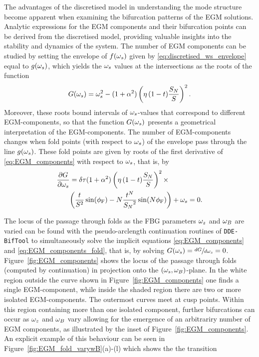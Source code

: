 %
The advantages of the discretised model in understanding the mode structure become apparent when examining the bifurcation patterns of the EGM solutions.
Analytic expressions for the EGM components and their bifurcation points can be derived from the discretised model, providing valuable insights into the stability and dynamics of the system.
The number of EGM components can be studied by setting the envelope of $f(\omega_s)$ given by \eqref{eq:discretised_ws_envelope} equal to $g(\omega_s)$, which yields the $\omega_s$ values at the intersections as the roots of the function
%
\begin{equation}
    \label{eq:EGM_components}
    G(\omega_s) = \omega_s^2 - (1+\alpha^2)\left( \eta \, (1-t) \frac{S_N}{S} \right)^2.
 \end{equation}
Moreover, these roots bound intervals of $\omega_s$-values that correspond to different EGM-components, so that the function $G(\omega_s)$ presents a geometrical interpretation of the EGM-components. 
The number of EGM-components changes when fold points (with respect to $\omega_s$) of the envelope pass through the line $g(\omega_s)$. 
These fold points are given by roots of the first derivative of \eqref{eq:EGM_components} with respect to $\omega_s$, that is, by
%
\begin{gather}
    \label{eq:EGM_components_fold}
    \begin{aligned}
        \frac{\partial G}{\partial \omega_s} &= \delta \tau (1+\alpha^2)\left( \eta \, (1-t) \frac{S_N}{S} \right)^2 \times \\ 
        &\bigg(  \frac{t}{S^2} \sin(\phi_\text{F}) - N \frac{t^{N}}{{S_N}^2}\sin(N\phi_\text{F}) \bigg) + \omega_s = 0.
    \end{aligned}
\end{gather}
%
\par
%
The locus of the passage through folds as the FBG parameters $\omega_z$ and $\omega_B$ are varied can be found with the pseudo-arclength continuation routines of \texttt{DDE-BifTool} \cite{sieber2014dde} to simultaneously solve the implicit equations \eqref{eq:EGM_components} and \eqref{eq:EGM_components_fold}, that is, by solving $G(\omega_s) = \sfrac{dG}{d\omega_s} = 0$.
Figure~\ref{fig:EGM_components} shows the locus of the passage through folds (computed by continuation) in projection onto the $(\omega_s, \omega_B)$-plane.
In the white region outside the curve shown in Figure~\ref{fig:EGM_components} one finds a single EGM-component, while inside the shaded region there are two or more isolated EGM-components.
The outermost curves meet at cusp points.
Within this region containing more than one isolated component, further bifurcations can occur as $\omega_z$ and $\omega_B$ vary allowing for the emergence of an arbitrariry number of EGM components, as illustrated by the inset of Figure~\ref{fig:EGM_components}.
An explicit example of this behaviour can be seen in Figure~\ref{fig:EGM_fold_varywB}(a)-(l) which shows the the transition


